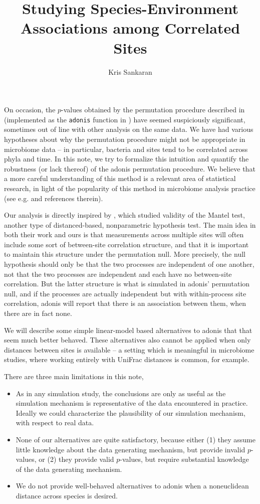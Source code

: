 \documentclass{article}
\title{Studying Species-Environment Associations among Correlated Sites}
\author{Kris Sankaran}
\begin{document}
\maketitle

On occasion, the $p$-values obtained by the permutation procedure described in
\citep{anderson2001new} (implemented as the \texttt{adonis} function in
\cite{oksanen2007vegan}) have seemed suspiciously significant, sometimes out of
line with other analysis on the same data. We have had various hypotheses about
why the permutation procedure might not be appropriate in microbiome data -- in
particular, bacteria and sites tend to be correlated across phyla and time. In
this note, we try to formalize this intuition and quantify the robustness (or
lack thereof) of the adonis permutation procedure. We believe that a more
careful understanding of this method is a relevant area of statistical research,
in light of the popularity of this method in microbiome analysis practice (see
e.g. \cite{fukuyama2012comparisons} and references therein).

Our analysis is directly inspired by \citep{guillot2013dismantling}, which
studied validity of the Mantel test, another type of distanced-based,
nonparametric hypothesis test. The main idea in both their work and ours is that
measurements across multiple sites will often include some sort of between-site
correlation structure, and that it is important to maintain this structure under
the permutation null. More precisely, the null hypothesis should only be that
the two processes are independent of one another, not that the two processes are
independent and each have no between-site correlation. But the latter structure
is what is simulated in adonis' permutation null, and if the processes are
actually independent but with within-process site correlation, adonis will
report that there is an association between them, when there are in fact none.

We will describe some simple linear-model based alternatives to adonis that that
seem much better behaved. These alternatives also cannot be applied when only
distances between sites is available -- a setting which is meaningful in
microbiome studies, where working entirely with UniFrac distances
\citep{lozupone2005unifrac} is common, for example.

There are three main limitations in this note,
\begin{itemize}
\item As in any simulation study, the conclusions are only as useful as the
  simulation mechanism is representative of the data encountered in practice.
  Ideally we could characterize the plausibility of our simulation mechanism,
  with respect to real data.
\item None of our alternatives are quite satisfactory, because either (1) they
  assume little knowledge about the data generating mechanism, but provide
  invalid $p$-values, or (2) they provide valid $p$-values, but require
  substantial knowledge of the data generating mechanism.
\item We do not provide well-behaved alternatives to adonis when a noneuclidean
  distance across species is desired.
\end{itemize}
\end{document}
